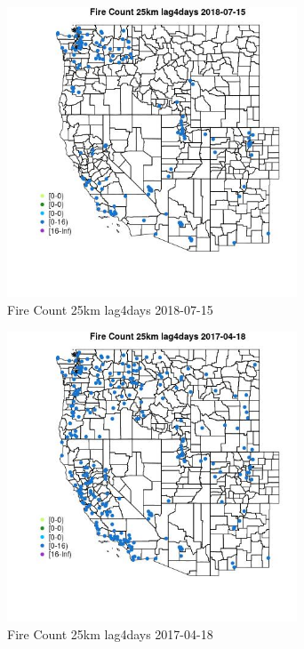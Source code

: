 \begin{figure} 
\centering  
\includegraphics[width=0.77\textwidth]{Code_Outputs/Report_ML_input_PM25_Step4_part_e_de_duplicated_aves_compiled_2019-05-20wNAs_MapObsFire_Count_25km_lag4days2018-07-15.jpg} 
\caption{\label{fig:Report_ML_input_PM25_Step4_part_e_de_duplicated_aves_compiled_2019-05-20wNAsMapObsFire_Count_25km_lag4days2018-07-15}Fire Count 25km lag4days 2018-07-15} 
\end{figure} 
 

\begin{figure} 
\centering  
\includegraphics[width=0.77\textwidth]{Code_Outputs/Report_ML_input_PM25_Step4_part_e_de_duplicated_aves_compiled_2019-05-20wNAs_MapObsFire_Count_25km_lag4days2017-04-18.jpg} 
\caption{\label{fig:Report_ML_input_PM25_Step4_part_e_de_duplicated_aves_compiled_2019-05-20wNAsMapObsFire_Count_25km_lag4days2017-04-18}Fire Count 25km lag4days 2017-04-18} 
\end{figure} 
 

